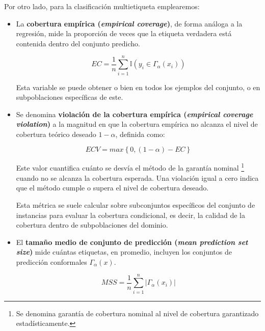 Por otro lado, para la clasificación multietiqueta emplearemos:

\begin{itemize}

    \item La \textbf{cobertura empírica (\textit{empirical coverage})}, de forma análoga a la regresión, mide la proporción de veces que la etiqueta verdadera está contenida dentro del conjunto predicho.

    $$
    EC = \frac{1}{n} \sum_{i=1}^{n} \mathbb{I}(y_i \in \Gamma_\alpha(x_i))
    $$

    Esta variable se puede obtener o bien en todos los ejemplos del conjunto, o en subpoblaciones específicas de este.

    \item Se denomina \textbf{violación de la cobertura empírica (\textit{empirical coverage violation})} a la magnitud en que la cobertura empírica no alcanza el nivel de cobertura teórico deseado $1 - \alpha$, definida como:

    $$
    ECV = max \left\{ 0,(1-\alpha)-EC \right\}
    $$

    Este valor cuantifica cuánto se desvía el método de la garantía nominal
    \footnote{
        Se denomina garantía de cobertura nominal al nivel de cobertura garantizado estadísticamente.
    } 
    cuando no se alcanza la cobertura esperada. Una violación igual a cero indica que el método cumple o supera el nivel de cobertura deseado.

    Esta métrica se suele calcular sobre subconjuntos específicos del conjunto de instancias para evaluar la cobertura condicional, es decir, la calidad de la cobertura dentro de subpoblaciones del dominio.

    \item El \textbf{tamaño medio de conjunto de predicción (\textit{mean prediction set size})} mide cuántas etiquetas, en promedio, incluyen los conjuntos de predicción conformales $\Gamma_\alpha(x)$.

    $$
    MSS = \frac{1}{n} \sum_{i=1}^n | \Gamma_\alpha(x_i) |
    $$


    
\end{itemize}


